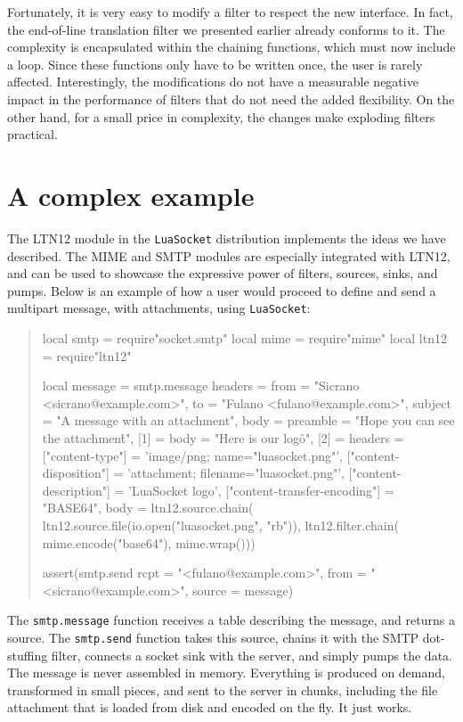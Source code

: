 \documentclass[10pt]{article}
\begin{document}
Fortunately, it is very easy to modify a filter to respect
the new interface. In fact, the end-of-line translation
filter we presented earlier already conforms to it.  The
complexity is encapsulated within the chaining functions,
which must now include a loop. Since these functions only
have to be written once, the user is rarely affected.
Interestingly, the modifications do not have a measurable
negative impact in the performance of filters that do
not need the added flexibility. On the other hand, for a
small price in complexity, the changes make exploding
filters practical. 

\section{A complex example}

The LTN12 module in the \texttt{LuaSocket} distribution
implements the ideas we have described. The MIME
and SMTP modules are especially integrated with LTN12, 
and can be used to showcase the expressive power of filters,
sources, sinks, and pumps. Below is an example 
of how a user would proceed to define and send a
multipart message, with attachments, using \texttt{LuaSocket}:
\begin{quote}
\begin{mime}
local smtp = require"socket.smtp"
local mime = require"mime"
local ltn12 = require"ltn12"

local message = smtp.message{
  headers = {
    from = "Sicrano <sicrano@example.com>",
    to = "Fulano <fulano@example.com>",
    subject = "A message with an attachment"},
  body = {
    preamble = "Hope you can see the attachment\r\n",
    [1] = {
      body = "Here is our logo\r\n"},
    [2] = {
      headers = {
        ["content-type"] = 'image/png; name="luasocket.png"',
        ["content-disposition"] = 
          'attachment; filename="luasocket.png"',
        ["content-description"] = 'LuaSocket logo',
        ["content-transfer-encoding"] = "BASE64"},
      body = ltn12.source.chain(
        ltn12.source.file(io.open("luasocket.png", "rb")),
        ltn12.filter.chain(
          mime.encode("base64"),
          mime.wrap()))}}}

assert(smtp.send{
  rcpt = "<fulano@example.com>",
  from = "<sicrano@example.com>",
  source = message})
\end{mime}
\end{quote}

The \texttt{smtp.message} function receives a table
describing the message, and returns a source. The
\texttt{smtp.send} function takes this source, chains it with the
SMTP dot-stuffing filter, connects a socket sink
with the server, and simply pumps the data. The message is never 
assembled in memory.  Everything is produced on demand, 
transformed in small pieces, and sent to the server in chunks, 
including the file attachment that is loaded from disk and 
encoded on the fly. It just works.
\end{document}
